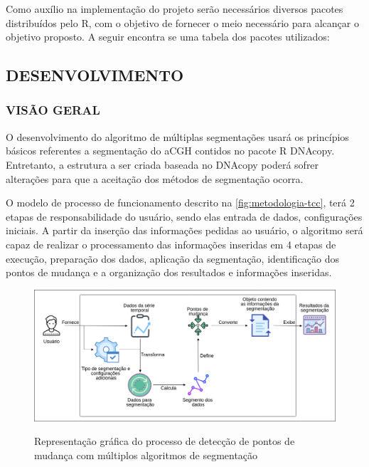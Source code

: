 Como auxílio na implementação do projeto serão necessários diversos pacotes distribuídos pelo R, com o objetivo de fornecer o meio necessário para alcançar o objetivo proposto. A seguir encontra se uma tabela dos pacotes utilizados:




\subsection{DESENVOLVIMENTO}

\subsubsection{VISÃO GERAL}

O desenvolvimento do algoritmo de múltiplas segmentações usará os princípios básicos referentes a segmentação do aCGH contidos no pacote R DNAcopy. Entretanto, a estrutura a ser criada baseada no DNAcopy poderá sofrer alterações para que a aceitação dos métodos de segmentação ocorra.

O modelo de processo de funcionamento descrito na \autoref{fig:metodologia-tcc}, terá 2 etapas de responsabilidade do usuário, sendo elas entrada de dados, configurações iniciais. A partir da inserção das informações pedidas ao usuário, o algoritmo será capaz de realizar o processamento das informações inseridas em 4 etapas de execução, preparação dos dados, aplicação da segmentação, identificação dos pontos de mudança e a organização dos resultados e informações inseridas.

\begin{figure}[!htb]
    \centering
    \caption{Representação gráfica do processo de detecção de pontos de mudança com múltiplos algoritmos de segmentação}
    \includegraphics[width=1\textwidth]{./dados/figuras/metodologia-tcc}
    \label{fig:metodologia-tcc}
\end{figure}

